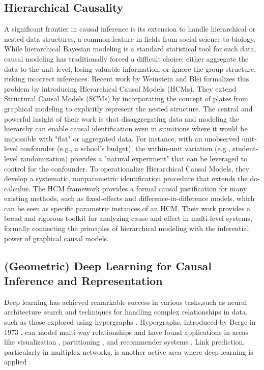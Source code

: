 {{\subsection{Hierarchical Causality}
\label{subsec:hierarchical_causality}

A significant frontier in causal inference is its extension to handle hierarchical or nested data structures, a common feature in fields from social science to biology. While hierarchical Bayesian modeling is a standard statistical tool for such data, causal modeling has traditionally forced a difficult choice: either aggregate the data to the unit level, losing valuable information, or ignore the group structure, risking incorrect inferences.
Recent work by Weinstein and Blei\cite{weinstein2024hierarchical} formalizes this problem by introducing Hierarchical Causal Models (HCMs). They extend Structural Causal Models (SCMs) by incorporating the concept of plates from graphical modeling to explicitly represent the nested structure. The central and powerful insight of their work is that disaggregating data and modeling the hierarchy can enable causal identification even in situations where it would be impossible with "flat" or aggregated data. For instance, with an unobserved unit-level confounder (e.g., a school's budget), the within-unit variation (e.g., student-level randomization) provides a "natural experiment" that can be leveraged to control for the confounder.
To operationalize Hierarchical Causal Models, they develop a systematic, nonparametric identification procedure that extends the do-calculus. The HCM framework provides a formal causal justification for many existing methods, such as fixed-effects and difference-in-difference models, which can be seen as specific parametric instances of an HCM. Their work provides a broad and rigorous toolkit for analyzing cause and effect in multi-level systems, formally connecting the principles of hierarchical modeling with the inferential power of graphical causal models.

\subsection{(Geometric) Deep Learning for Causal Inference and Representation}
\label{subsec:geometric_dl_causality}

Deep learning has achieved remarkable success in various tasks,such as neural architecture search \cite{Baker2017aDesigning, Bender2018Understanding} and techniques for handling complex relationships in data, such as those explored using hypergraphs \cite{Ouvrard2020Hypergraphs, Berge1973Graphs}. Hypergraphs, introduced by Berge in 1973 \cite{Berge1973Graphs}, can model multi-way relationships and have found applications in areas like visualization \cite{Alsallakh2016State, Jacomy2014ForceAtlas2}, partitioning \cite{Catalyurek1999Hypergraph, Devine2006Parallel, Yang2017Hypergraph}, and recommender systems \cite{Zheng2018Novel, Zhou2007Learning, Wu2018Nonnegative, Jin2015Low, Zhu2015ContentBased, Zhu2016Heterogeneous}. Link prediction, particularly in multiplex networks, is another active area where deep learning is applied \cite{Potluru2020Deeplex, Zhang2018Link}.

}}
